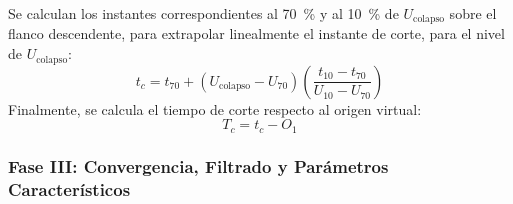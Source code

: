 \begin{enumerate}[resume]
\begin{equation}
    \end{equation}
    Se calculan los instantes correspondientes al \qty{70}{\percent} y al \qty{10}{\percent} de $U_\text{colapso}$ sobre el flanco descendente, para extrapolar linealmente el instante de corte, para el nivel de $U_{\text{colapso}}$:
    \begin{equation}
        t_c = t_{70} + (U_{\text{colapso}} - U_{70}) \left(\frac{t_{10} - t_{70}}{U_{10} - U_{70}}\right)
    \end{equation}
    Finalmente, se calcula el tiempo de corte respecto al origen virtual:
    \begin{equation}
        T_c = t_c - O_1
    \end{equation}
\end{enumerate}

\subsubsection{Fase III: Convergencia, Filtrado y Parámetros Característicos}

